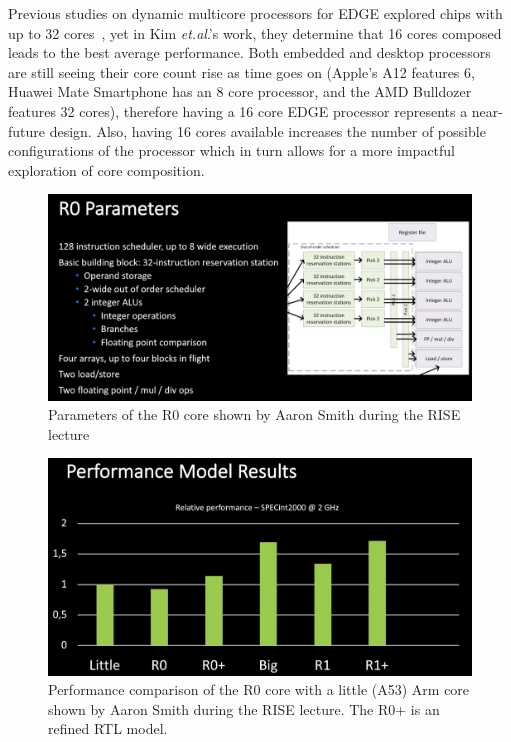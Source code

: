 Previous studies on dynamic multicore processors for EDGE explored chips with up to 32 cores~\cite{kim2007tflex, gulati2008multitaskingdmc}, yet in Kim {\it et.al}.'s work, they determine that 16 cores composed leads to the best average performance.
Both embedded and desktop processors are still seeing their core count rise as time goes on (Apple's A12 features 6, Huawei Mate Smartphone has an 8 core processor, and the AMD Bulldozer features 32 cores), therefore having a 16 core EDGE processor represents a near-future design.
Also, having 16 cores available increases the number of possible configurations of the processor which in turn allows for a more impactful exploration of core composition.

\begin{figure}[t]
  \centering
    \includegraphics[width=1\textwidth]{setup/r0_parameters.png}
    \caption{Parameters of the R0 core shown by Aaron Smith during the RISE lecture}\label{fig:r0}
\end{figure}

\begin{figure}[t]
  \centering
    \includegraphics[width=1\textwidth]{setup/results.png}
    \caption{Performance comparison of the R0 core with a little (A53) Arm core shown by Aaron Smith during the RISE lecture. The R0+ is an refined RTL model.}\label{fig:r0perf}
\end{figure}

